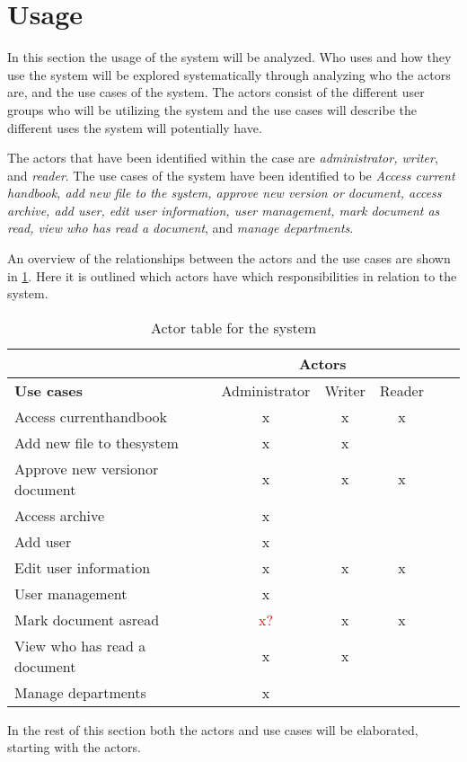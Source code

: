\section{Usage}\label{sec:Usage}
In this section the usage of the system will be analyzed.
Who uses and how they use the system will be explored systematically through analyzing who the actors are, and the use cases of the system.
The actors consist of the different user groups who will be utilizing the system and the use cases will describe the different uses the system will potentially have.

The actors that have been identified within the case are \textit{administrator, writer}, and \textit{reader}.
The use cases of the system have been identified to be \textit{Access current handbook, add new file to the system, approve new version or document, access archive, add user, edit user information, user management, mark document as read, view who has read a document}, and \textit{manage departments}.

An overview of the relationships between the actors and the use cases are shown in \cref{tab:ActorTable}.
Here it is outlined which actors have which responsibilities in relation to the system.

\begin{table}[H]
	\begin{center}
	\begin{tabular}{| m{10em} | c | c | c | c | c |}
		\hline
		& \multicolumn{3}{c|}{\textbf{Actors}} \\
		\hline
		\textbf{Use cases} & Administrator  & Writer & Reader \\
		\hline
		Access current\newline handbook & x & x & x \\
		\hline
		Add new file to the\newline system & x & x & \\
		\hline
		Approve new version\newline or document & x & x & x \\
		\hline
		Access archive & x & & \\
		\hline
		Add user & x & & \\
		\hline
		Edit user information & x & x & x\\
		\hline
		User management & x & & \\
		\hline
		Mark document as\newline read & \textcolor{red}{x?} & x & x \\
		\hline
		View who has read a document & x & x & \\
		\hline
		Manage departments & x & & \\
		\hline
	\end{tabular}
	\end{center}
	\caption{Actor table for the system}\label{tab:ActorTable}
\end{table}

In the rest of this section both the actors and use cases will be elaborated, starting with the actors.